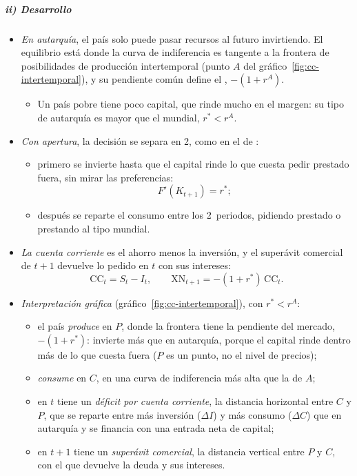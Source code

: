 \documentclass[11pt]{article}
\begin{document}
\subparagraph{ii) Desarrollo}

\begin{itemize}
\item \emph{En autarquía}, el país solo puede pasar recursos al futuro invirtiendo. El equilibrio está donde la curva de indiferencia es tangente a la frontera de posibilidades de producción intertemporal (punto $A$ del gráfico~\ref{fig:cc-intertemporal}), y su pendiente común define el , $-(1+r^A)$.
  \begin{itemize}
  \item Un país pobre tiene poco capital, que rinde mucho en el margen: su tipo de autarquía es mayor que el mundial, $r^*<r^A$.
  \end{itemize}
\item \emph{Con apertura}, la decisión se separa en 2, como en el  de  :
  \begin{itemize}
  \item primero se invierte hasta que el capital rinde lo que cuesta pedir prestado fuera, sin mirar las preferencias:
    \begin{equation}\label{eq:inversion-abierta}
    F'(K_{t+1})=r^* ;
    \end{equation}
  \item después se reparte el consumo entre los 2~periodos, pidiendo prestado o prestando al tipo mundial.
  \end{itemize}
\item \emph{La cuenta corriente} es el ahorro menos la inversión, y el superávit comercial de $t+1$ devuelve lo pedido en $t$ con sus intereses:
  \begin{equation}\label{eq:cc-intertemporal}
  \mathrm{CC}_t=S_t-I_t ,\qquad \mathrm{XN}_{t+1}=-(1+r^*)\,\mathrm{CC}_t .
  \end{equation}
\item \emph{Interpretación gráfica} (gráfico~\ref{fig:cc-intertemporal}), con $r^*<r^A$:
  \begin{itemize}
  \item el país \emph{produce} en $P$, donde la frontera tiene la pendiente del mercado, $-(1+r^*)$: invierte más que en autarquía, porque el capital rinde dentro más de lo que cuesta fuera ($P$ es un punto, no el nivel de precios);
  \item \emph{consume} en $C$, en una curva de indiferencia más alta que la de $A$;
  \item en $t$ tiene un \emph{déficit por cuenta corriente}, la distancia horizontal entre $C$ y $P$, que se reparte entre más inversión ($\Delta I$) y más consumo ($\Delta C$) que en autarquía y se financia con una entrada neta de capital;
  \item en $t+1$ tiene un \emph{superávit comercial}, la distancia vertical entre $P$ y $C$, con el que devuelve la deuda y sus intereses.
  \end{itemize}
\end{itemize}
\end{document}
